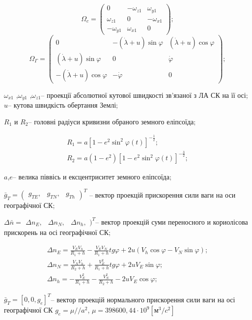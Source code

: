 \[\Omega_{c} =\left(\begin{array}{ccc} 
{0} & {-\omega {}_{z1} } & {\omega {}_{y1} } \\ 
{\omega {}_{z1} } & {0} & {-\omega {}_{x1} } \\ 
{-\omega {}_{y1} } & {\omega {}_{x1}} & {0} 
\end{array}\right);\] 
\[\Omega_{\Gamma } =\left(\begin{array}{ccc} 
{0} & {-(\dot{\lambda }+u)\sin \varphi } & {(\dot{\lambda }+u)\cos \varphi } \\ 
{(\dot{\lambda}+u)\sin \varphi } & {0} & {\dot{\varphi }} \\
{-(\dot{\lambda }+u)\cos \varphi } & {-\dot{\varphi }} & {0} 
\end{array}\right);\] 
\begin{ESKDexplanation}
\item $\omega_{x1}$ ,$\omega_{y1}$ ,$\omega_{z1}$-- проекції абсолютної кутової швидкості 
зв'язаної з ЛА СК на її осі; $u$-- кутова швидкість обертання Землі; 
\item $R_{1} $ и $R_{2} $-- головні радіуси кривизни обраного земного еліпсоїда;
\end{ESKDexplanation}

\[\begin{array}{l} 
{R_{1} =a\left[1-e^{2} \sin ^{2} \varphi (t)\right]^{-\frac{1}{2}};} \\ 
{R_{2} =a\left(1-e^{2} \right)\left[1-e^{2} \sin ^{2} \varphi(t)\right]^{-\frac{3}{2}};} 
\end{array}\] 
\begin{ESKDexplanation}
\item $a$,$e$-- велика піввісь и ексцентриситет земного еліпсоїда;
\item $\bar{g}_{T} =(\begin{array}{ccc}{g_{TE},}&{g_{TN},}&{g_{Th} }\end{array})^{T} $
-- вектор проекцій прискорення сили ваги на оси географічної СК;
\item $\Delta \bar{n}=\begin{array}{ccc} {\Delta n_{E} ,} & {\Delta n_{N} ,} & {
\Delta n_{h} ,} \end{array})^{T} $-- вектор проекцій суми переносного и кориолісова 
прискорень на осі географічної СК;
\end{ESKDexplanation}
\[\begin{array}{l} 
{\Delta n_{E} =\frac{V_{E} V_{h} }{R_{1} +h} -\frac{V_{E} V_{N}}{R_{1} +h} tg\varphi +2u\left(V_{h} \cos \varphi -V_{N} \sin \varphi \right);} \\ 
{\Delta n_{N} =\frac{V_{N} V_{h} }{R_{2} +h} +\frac{V_{E}^{2} }{R_{1} +h} tg\varphi+2uV_{E} \sin \varphi ;} \\ 
{\Delta n_{h} =-\frac{V_{E}^{2} }{R_{1} +h} -\frac{V_{N}^{2}}{R_{2} +h} -2uV_{E} \cos \varphi ;} 
\end{array}\] 
\begin{ESKDexplanation}
\item $\bar{g}_{T} =\left[0,0,g_{e} \right]^{T} $-- вектор проекцій нормального 
прискорення сили ваги на осі географічної СК 
$g_{e}=\mu//a^{2}$, $\mu=398600,44\cdot 10^{9} \left[\text{м}^{3}/c^{2} \right]$
\end{ESKDexplanation}


